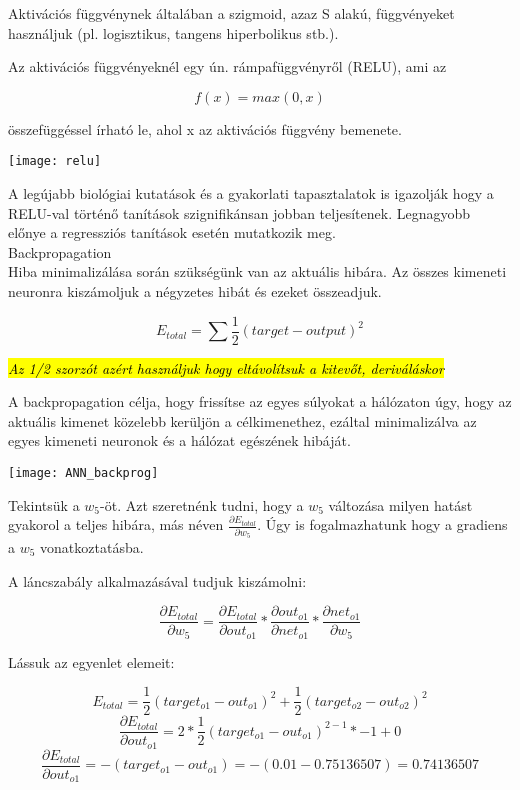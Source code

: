 Aktivációs függvénynek általában a szigmoid, azaz S alakú, függvényeket használjuk (pl. logisztikus, tangens hiperbolikus stb.).

Az aktivációs függvényeknél egy ún. rámpafüggvényről (RELU), ami az

\[ f(x) = max(0,x) \]

összefüggéssel írható le, ahol x az aktivációs függvény bemenete.

\begin{center}
\texttt{[image: relu]}
\end{center}

A legújabb biológiai kutatások és a gyakorlati tapasztalatok is igazolják hogy a RELU-val történő tanítások szignifikánsan jobban teljesítenek. Legnagyobb előnye a regressziós tanítások esetén mutatkozik meg.\\

{\Large Backpropagation}\\

Hiba minimalizálása során szükségünk van az aktuális hibára. Az összes kimeneti neuronra kiszámoljuk a négyzetes hibát és ezeket összeadjuk.

\[ E_{total} = \sum \dfrac{1}{2}(target - output)^2\]

\textit{\hl{Az 1/2 szorzót azért használjuk hogy eltávolítsuk a kitevőt, deriváláskor}
}

A backpropagation célja, hogy frissítse az egyes súlyokat a hálózaton úgy, hogy az aktuális kimenet közelebb kerüljön a célkimenethez, ezáltal minimalizálva az egyes kimeneti neuronok és a hálózat egészének hibáját.

\begin{center}
\texttt{[image: ANN\_backprog]}
\end{center}

Tekintsük a \(w_5\)-öt. Azt szeretnénk tudni, hogy a \(w_5\) változása milyen hatást gyakorol a teljes hibára, más néven $\frac{\partial E_ {total}}{\partial w_ {5}}$. Úgy is fogalmazhatunk hogy a gradiens a \(w_5\) vonatkoztatásba.

A láncszabály alkalmazásával tudjuk kiszámolni:

\[\frac{\partial E_{total}}{\partial w_{5}} = \frac{\partial E_{total}}{\partial out_{o1}} * \frac{\partial out_{o1}}{\partial net_{o1}} * \frac{\partial net_{o1}}{\partial w_{5}}\]

Lássuk az egyenlet elemeit:
\begin{flushleft}
\begin{equation}
E_{total} = \frac{1}{2}(target_{o1} - out_{o1})^{2} + \frac{1}{2}(target_{o2} - out_{o2})^{2}
\end{equation}
\begin{equation}
\frac{\partial E_{total}}{\partial out_{o1}} = 2 * \frac{1}{2}(target_{o1} - out_{o1})^{2 - 1} * -1 + 0
\end{equation}
\begin{equation}
\frac{\partial E_{total}}{\partial out_{o1}} = -(target_{o1} - out_{o1}) = -(0.01 - 0.75136507) = 0.74136507
\end{equation}

\end{flushleft}

